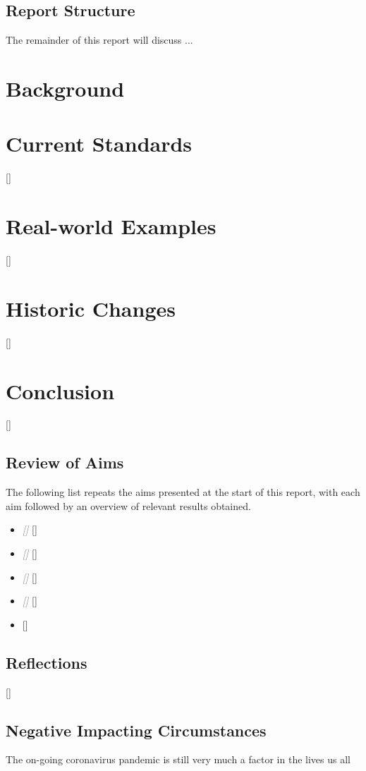 \documentclass{article}
\begin{document}
    \subsection{Report Structure}
        The remainder of this report will discuss ...
\newpage
\section{Background}
\label{sec:background)}
\section{Current Standards}
        []
\section{Real-world Examples}
    []
\section{Historic Changes}
    []
\section{Conclusion}
\label{sec:conclusion}
    []
    \subsection{Review of Aims}
        The following list repeats the aims presented at the start of this report, with each aim followed by an overview of relevant results obtained.
        \begin{itemize}
            \item \textcolor{gray}{\textit{[]}}
                []
            \item \textcolor{gray}{\textit{[]}}
                []
            \item \textcolor{gray}{\textit{[]}}
                []
            \item \textcolor{gray}{\textit{[]}}
                []
            \item \textcolor{gray}{\textit{}}
                []
        \end{itemize}
    \subsection{Reflections}
        []
    \subsection{Negative Impacting Circumstances}
        The on-going coronavirus pandemic is still very much a factor in the lives us all
\end{document}
